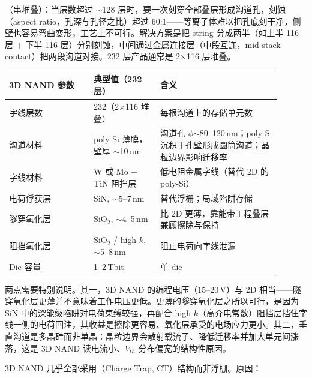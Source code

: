 （串堆叠）：当层数超过 $\sim$128 层时，要一次刻穿全部叠层形成沟道孔，刻蚀（aspect ratio，孔深与孔径之比）超过 60:1——等离子体难以把孔底刻干净，侧壁也容易弯曲变形，工艺上不可行。解决方案是把 string 分成两半（如上半 116 层 + 下半 116 层）分别刻蚀，中间通过金属连接层（中段互连，mid-stack contact）把两段沟道对接。232 层产品通常是 2$\times$116 层堆叠。

\begin{longtable}{L{0.28\linewidth}L{0.22\linewidth}L{0.4\linewidth}}
\toprule
3D NAND 参数 & 典型值（232 层） & 含义 \\
\midrule
字线层数 & 232（2$\times$116 堆叠） & 每根沟道上的存储单元数 \\\tablerowrule
沟道材料 & poly-Si 薄膜，壁厚 $\sim$10\,nm & 沟道孔 $\phi$$\sim$80--120\,nm；poly-Si 沉积于孔壁形成圆筒沟道；晶粒边界影响迁移率 \\\tablerowrule
字线材料 & W 或 Mo + TiN 阻挡层 & 低电阻金属字线（替代 2D 的 poly-Si） \\\tablerowrule
电荷俘获层 & SiN, $\sim$5--7\,nm & 替代浮栅；局域陷阱存储 \\\tablerowrule
隧穿氧化层 & SiO$_2$, $\sim$4--5\,nm & 比 2D 更薄，靠能带工程叠层兼顾擦除与保持 \\\tablerowrule
阻挡氧化层 & SiO$_2$ / high-$k$, $\sim$5--8\,nm & 阻止电荷向字线泄漏 \\\tablerowrule
Die 容量 & 1--2\,Tbit & 单 die \\
\bottomrule
\end{longtable}

两点需要特别说明。其一，3D NAND 的编程电压（15--20\,V）与 2D 相当——隧穿氧化层更薄并不意味着工作电压更低。更薄的隧穿氧化层之所以可行，是因为 SiN 中的深能级陷阱对电荷束缚较强，再配合 high-$k$（高介电常数）阻挡层挡住字线一侧的电荷回注，其收益是擦除更容易、氧化层承受的电场应力更小。其二，垂直沟道是多晶硅而非单晶：晶粒边界会散射载流子、降低迁移率并加大单元间涨落，这是 3D NAND 读电流小、$V_{th}$ 分布偏宽的结构性原因。


3D NAND 几乎全部采用（Charge Trap, CT）结构而非浮栅。原因：


